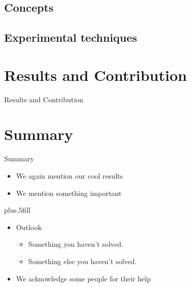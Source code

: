   \subsection{Concepts}

  \subsection{Experimental techniques}


\section{Results and Contribution}
\begin{frame}{Results and Contribution}

\end{frame}


\section*{Summary}
\begin{frame}{Summary}
  \begin{itemize}
  \item[\cmark] We again mention our cool results
  \item We mention something important
  \end{itemize}
  
  \vskip0pt plus.5fill
  \begin{itemize}
  \item
    Outlook
    \begin{itemize}
    \item[\xmark]
      Something you haven't solved.
    \item
      Something else you haven't solved.
    \end{itemize}
  \item[\ding{43}] We acknowledge some people for their help
  \end{itemize}
\end{frame}



